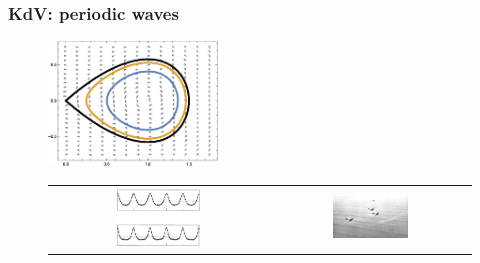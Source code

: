 \documentclass[16pt]{beamer}
\begin{document}
\begin{frame}
\frametitle{KdV: periodic waves}
\fontsize{16}{7.2}\selectfont

\begin{figure}[H]
\begin{center}
\includegraphics[width=0.4\textwidth]{images/KdV3phaseportrait.eps}
\end{center}
\end{figure}

\begin{figure}[H]
\begin{center}
\begin{tabular}{cc}
\includegraphics[width=0.4\textwidth]{images/cnoidal3.png} & \includegraphics[width=0.4\textwidth]{images/cnoidal.jpg}
\end{tabular}
\end{center}
\end{figure}
\end{frame}
\end{document}
